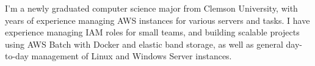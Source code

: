 

\begin{cvparagraph}

I'm a newly graduated computer science major from Clemson University, with years of experience managing AWS instances for various servers and tasks. I have experience managing IAM roles for small teams, and building scalable projects using AWS Batch with Docker and elastic band storage, as well as general day-to-day management of Linux and Windows Server instances.
\end{cvparagraph}